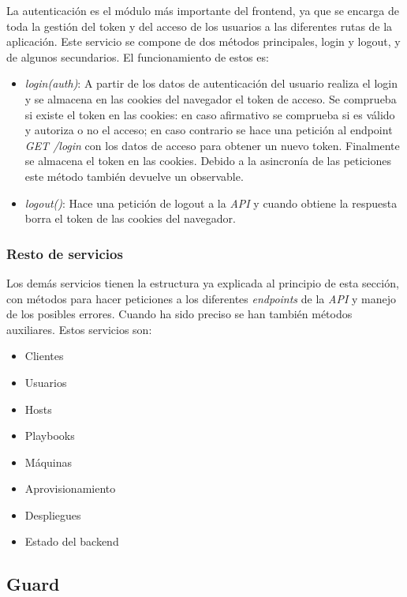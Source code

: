 La autenticación es el módulo más importante del frontend, ya que se encarga de toda la gestión del token y del acceso de los usuarios a las diferentes rutas de la aplicación. Este servicio se compone de dos métodos principales, login y logout, y de algunos secundarios. El funcionamiento de estos es:
\begin{itemize}
	\item \textit{login(auth)}: A partir de los datos de autenticación del usuario realiza el login y se almacena en las cookies del navegador el token de acceso. Se comprueba si existe el token en las cookies: en caso afirmativo se comprueba si es válido y autoriza o no el acceso; en caso contrario se hace una petición al endpoint \textit{GET /login} con los datos de acceso para obtener un nuevo token. Finalmente se almacena el token en las cookies. Debido a la asincronía de las peticiones este método también devuelve un observable.
	\item \textit{logout()}: Hace una petición de logout a la \textit{API} y cuando obtiene la respuesta borra el token de las cookies del navegador.
\end{itemize}



\subsubsection{Resto de servicios}

Los demás servicios tienen la estructura ya explicada al principio de esta sección, con métodos para hacer peticiones a los diferentes \textit{endpoints} de la \textit{API} y manejo de los posibles errores. Cuando ha sido preciso se han también métodos auxiliares. Estos servicios son:
\begin{itemize}
	\item Clientes
	\item Usuarios
	\item Hosts
	\item Playbooks
	\item Máquinas
	\item Aprovisionamiento
	\item Despliegues
	\item Estado del backend
\end{itemize}


\subsection{Guard}

